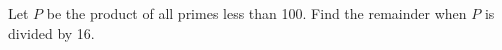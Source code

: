 Let $ P $ be the product of all primes less than 100. Find the remainder when $ P $ is divided by 16.

